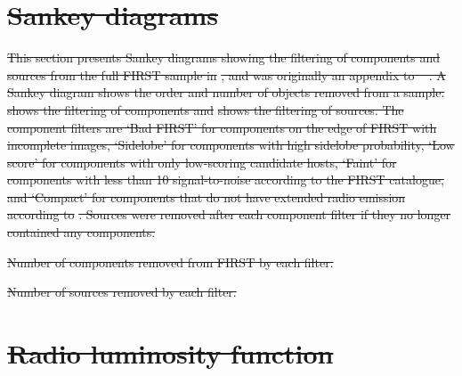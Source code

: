 \documentclass[11pt, a4paper]{book}
\providecommand{\DIFdeltex}[1]{{\protect\color{red}\sout{#1}}}                      %
\providecommand{\DIFdelFL}[1]{\DIFdel{#1}} %
\providecommand{\DIFdel}[1]{\texorpdfstring{\DIFdeltex{#1}}{}} %
\begin{document}
\section{\DIFdel{Sankey diagrams}}
\addtocounter{section}{-1}%

\DIFdel{This section presents Sankey diagrams showing the filtering of components and sources from the full FIRST sample in }%
\DIFdel{, and was originally an appendix to \mbox{%
\citet{alger21rlfs}}\hspace{0pt}%
. A Sankey diagram shows the order and number of objects removed from a sample. }%
\DIFdel{shows the filtering of components and }%
\DIFdel{shows the filtering of sources. The component filters are `Bad FIRST' for components on the edge of FIRST with incomplete images, `Sidelobe' for components with high sidelobe probability, `Low score' for components with only low-scoring candidate hosts, `Faint' for components with less than 10 signal-to-noise according to the FIRST catalogue, and `Compact' for components that do not have extended radio emission according to }%
\DIFdel{. Sources were removed after each component filter if they no longer contained any components.
}%

{%
\DIFdelFL{Number of components removed from FIRST by each filter.}}

{%
\DIFdelFL{Number of sources removed by each filter.}}

\section{\DIFdel{Radio luminosity function}}
\addtocounter{section}{-1}%
\end{document}
